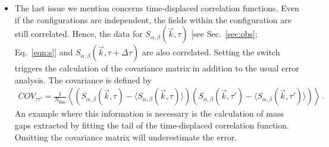 \begin{itemize}
	\item The last issue we mention concerns time-displaced correlation functions. Even if the configurations are independent, the fields within the configuration are still correlated. Hence, the data for $S_{\alpha,\beta}(\vec{k},\tau)$ [see Sec.~\ref{sec:obs}; Eq.~\eqref{eqn:s}] and $S_{\alpha,\beta}(\vec{k},\tau+\Delta\tau)$ are also correlated. Setting the switch  triggers the calculation of the covariance matrix in addition to the usual error analysis. The covariance is defined by
	\begin{align}
		COV_{\tau\tau'}=\frac{1}{N_{\text{Bin}}}\left\langle
		\left( S_{\alpha,\beta}(\vec{k},\tau) - \big\langle S_{\alpha,\beta}(\vec{k},\tau)\big\rangle \right)
		\left(S_{\alpha,\beta}(\vec{k},\tau')-\big\langle S_{\alpha,\beta}(\vec{k},\tau')\big\rangle \right)  \right\rangle\,.
	\end{align}
An example where this information is necessary is the  calculation of mass gaps extracted by fitting the  tail  of the time-displaced correlation function.  Omitting  the covariance matrix will  underestimate the  error.
\end{itemize}


%
